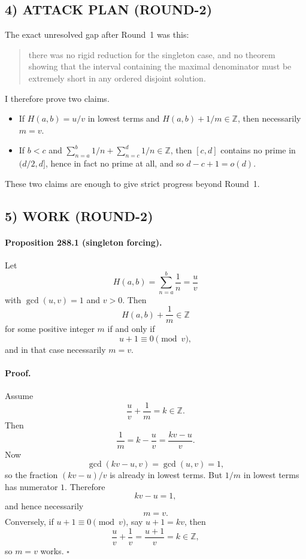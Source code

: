 \subsection*{4) ATTACK PLAN (ROUND-2)}
The exact unresolved gap after Round~1 was this:

\begin{quote}
	there was no rigid reduction for the singleton case, and no theorem showing that the interval containing the maximal denominator must be extremely short in any ordered disjoint solution.
\end{quote}

I therefore prove two claims.

\begin{itemize}
	\item[(C1)] If $H(a,b)=u/v$ in lowest terms and $H(a,b)+1/m\in\mathbb Z$, then necessarily $m=v$.
	\item[(C2)] If $b<c$ and $\sum_{n=a}^b 1/n+\sum_{n=c}^d 1/n\in\mathbb Z$, then $[c,d]$ contains no prime in $(d/2,d]$, hence in fact no prime at all, and so $d-c+1=o(d)$.
\end{itemize}

These two claims are enough to give strict progress beyond Round~1.

\subsection*{5) WORK (ROUND-2)}

\paragraph{Proposition 288.1 (singleton forcing).}
Let
\[
H(a,b)=\sum_{n=a}^b\frac1n=\frac uv
\]
with $\gcd(u,v)=1$ and $v>0$.
Then
\[
H(a,b)+\frac1m\in\mathbb Z
\]
for some positive integer $m$ if and only if
\[
u+1\equiv 0\pmod v,
\]
and in that case necessarily $m=v$.

\paragraph{Proof.}
Assume
\[
\frac uv+\frac1m=k\in\mathbb Z.
\]
Then
\[
\frac1m=k-\frac uv=\frac{kv-u}{v}.
\]
Now
\[
\gcd(kv-u,v)=\gcd(u,v)=1,
\]
so the fraction $(kv-u)/v$ is already in lowest terms. But $1/m$ in lowest terms has numerator $1$. Therefore
\[
kv-u=1,
\]
and hence necessarily
\[
m=v.
\]
Conversely, if $u+1\equiv 0\pmod v$, say $u+1=kv$, then
\[
\frac uv+\frac1v=\frac{u+1}{v}=k\in\mathbb Z,
\]
so $m=v$ works. \hfill$\square$

